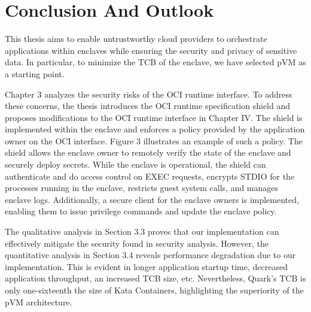 \chapter{Conclusion And Outlook}
\label{sec:conclusion}





This thesis aims to enable untrustworthy cloud providers to orchestrate applications within enclaves while ensuring the security and privacy of sensitive data. In particular, to minimize the TCB of the enclave, we have selected pVM as a starting point.
 
Chapter 3 analyzes the security risks of the OCI runtime interface. To address these concerns, the thesis introduces the OCI runtime specification shield and proposes modifications to the OCI runtime interface in Chapter IV. The shield is implemented within the enclave and enforces a policy provided by 
the application owner on the OCI interface. Figure 3 illustrates an example of such a policy. The shield allows the enclave owner to remotely verify the state of the enclave and securely deploy secrets. While the enclave is operational, the shield can authenticate and do access control on EXEC requests, 
encrypts STDIO for the processes running in the enclave, restricts guest system calls, and manages enclave logs. Additionally, a secure client for the enclave owners is implemented, enabling them to issue privilege commands and update the enclave policy.
 
The qualitative analysis in Section 3.3 proves that our implementation can effectively mitigate the security found in security analysis. However, the quantitative analysis in Section 3.4 reveals performance degradation due to our implementation. This is evident in longer application startup time, 
decreased application throughput, an increased TCB size, etc. Nevertheless, Quark's TCB is only one-sixteenth the size of Kata Containers, highlighting the superiority of the pVM architecture.
 

